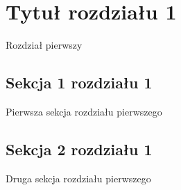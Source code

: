\chapter{Tytuł rozdziału 1}

Rozdział pierwszy

\section{Sekcja 1 rozdziału 1}

Pierwsza sekcja rozdziału pierwszego

\section{Sekcja 2 rozdziału 1}

Druga sekcja rozdziału pierwszego

